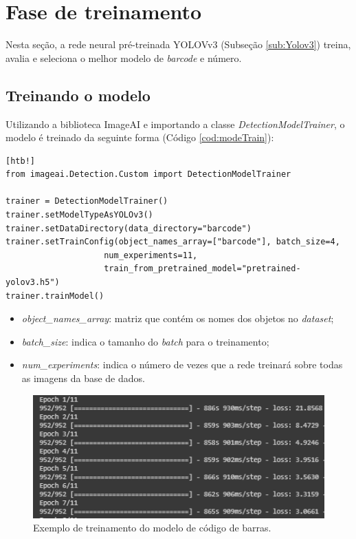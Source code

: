 \section{Fase de treinamento}

Nesta seção, a rede neural pré-treinada YOLOVv3 (Subseção \ref{sub:Yolov3}) treina, avalia e seleciona o melhor modelo de \textit{barcode} e número.

\subsection{Treinando o modelo}

Utilizando a biblioteca ImageAI e importando a classe \textit{DetectionModelTrainer}, o modelo é treinado da seguinte forma (Código \ref{cod:modeTrain}):
\newline
\begin{lstlisting}[caption=Exemplo de código do método \textit{data augmentation}, label=cod:modeTrain][htb!]
from imageai.Detection.Custom import DetectionModelTrainer

trainer = DetectionModelTrainer()
trainer.setModelTypeAsYOLOv3()
trainer.setDataDirectory(data_directory="barcode")
trainer.setTrainConfig(object_names_array=["barcode"], batch_size=4, 
                    num_experiments=11,
                    train_from_pretrained_model="pretrained-yolov3.h5")   
trainer.trainModel()
\end{lstlisting}

\begin{itemize}
    \item \textit{object\_names\_array}: matriz que contém os nomes dos objetos no \textit{dataset};
    \item \textit{batch\_size}: indica o tamanho do \textit{batch} para o treinamento;
    \item \textit{num\_experiments}: indica o número de vezes que a rede treinará sobre todas as imagens da base de dados.
\end{itemize}

\begin{figure}[H]
	\centering
	\includegraphics[width=0.7\linewidth]{figuras/MachineLearning/barcodeTraining.png}
	\caption{Exemplo de treinamento do modelo de código de barras.}
	\label{fig:barTrain}
\end{figure}

